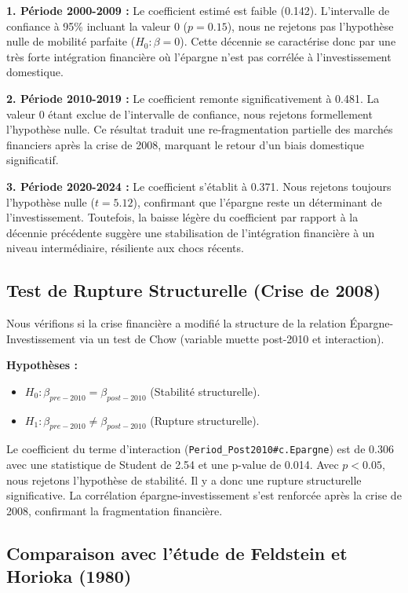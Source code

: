 \documentclass[12pt, a4paper]{article}
\begin{document}
\textbf{1. Période 2000-2009 :}
Le coefficient estimé est faible (0.142). L'intervalle de confiance à 95\% incluant la valeur 0 ($p=0.15$), nous ne rejetons pas l'hypothèse nulle de mobilité parfaite ($H_0 : \beta = 0$). Cette décennie se caractérise donc par une très forte intégration financière où l'épargne n'est pas corrélée à l'investissement domestique.


\textbf{2. Période 2010-2019 :}
Le coefficient remonte significativement à 0.481. La valeur 0 étant exclue de l'intervalle de confiance, nous rejetons formellement l'hypothèse nulle. Ce résultat traduit une re-fragmentation partielle des marchés financiers après la crise de 2008, marquant le retour d'un biais domestique significatif.

\textbf{3. Période 2020-2024 :}
Le coefficient s'établit à 0.371. Nous rejetons toujours l'hypothèse nulle ($t=5.12$), confirmant que l'épargne reste un déterminant de l'investissement. Toutefois, la baisse légère du coefficient par rapport à la décennie précédente suggère une stabilisation de l'intégration financière à un niveau intermédiaire, résiliente aux chocs récents.



\subsection{Test de Rupture Structurelle (Crise de 2008)}

Nous vérifions si la crise financière a modifié la structure de la relation Épargne-Investissement via un test de Chow (variable muette post-2010 et interaction).

\textbf{Hypothèses :}
\begin{itemize}
    \item $H_0 : \beta_{pre-2010} = \beta_{post-2010}$ (Stabilité structurelle).
    \item $H_1 : \beta_{pre-2010} \neq \beta_{post-2010}$ (Rupture structurelle).
\end{itemize}

Le coefficient du terme d'interaction (\texttt{Period\_Post2010\#c.Epargne}) est de 0.306 avec une statistique de Student de 2.54 et une p-value de 0.014.
Avec $p < 0.05$, nous rejetons l'hypothèse de stabilité.
Il y a donc une rupture structurelle significative. La corrélation épargne-investissement s'est renforcée après la crise de 2008, confirmant la fragmentation financière.
\subsection{Comparaison avec l'étude de Feldstein et Horioka (1980)}
\end{document}
